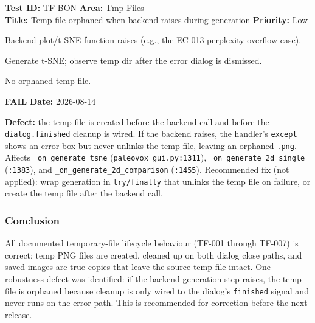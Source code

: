 \documentclass[12pt,a4paper]{article}
\newcommand{\fail}{\textcolor{paleored}{\textbf{FAIL}}}
\newcommand{\testheader}[4]{%
  \smallskip
  \noindent\textbf{Test ID:} #1 \hfill \textbf{Area:} #2 \\
  \textbf{Title:} #3 \hfill \textbf{Priority:} #4
}
\newenvironment{testbody}{%
  \begin{description}[leftmargin=2em,style=nextline]
}{%
  \end{description}
  \smallskip
}
\begin{document}
\testheader{TF-BON}{Tmp Files}{Temp file orphaned when backend raises during generation}{Low}
\begin{testbody}
  \item[\textbf{Preconditions:}] Backend plot/t-SNE function raises (e.g., the
        EC-013 perplexity overflow case).
  \item[\textbf{Steps:}] Generate t-SNE; observe temp dir after the error
        dialog is dismissed.
  \item[\textbf{Expected Result:}] No orphaned temp file.
  \item[\textbf{Status:}] \fail{} \hspace{1em} \textbf{Date:} 2026-08-14
  \item[\textbf{Notes:}] \textbf{Defect:} the temp file is created before the
        backend call and before the \texttt{dialog.finished} cleanup is wired.
        If the backend raises, the handler's \texttt{except} shows an error box
        but never unlinks the temp file, leaving an orphaned \texttt{.png}.
        Affects \texttt{\_on\_generate\_tsne} (\texttt{paleovox\_gui.py:1311}),
        \texttt{\_on\_generate\_2d\_single} (\texttt{:1383}), and
        \texttt{\_on\_generate\_2d\_comparison} (\texttt{:1455}). Recommended
        fix (not applied): wrap generation in \texttt{try/finally} that unlinks
        the temp file on failure, or create the temp file after the backend
        call.
\end{testbody}

\subsubsection{Conclusion}

All documented temporary-file lifecycle behaviour (TF-001 through TF-007) is
correct: temp PNG files are created, cleaned up on both dialog close paths, and
saved images are true copies that leave the source temp file intact. One
robustness defect was identified: if the backend generation step raises, the
temp file is orphaned because cleanup is only wired to the dialog's
\texttt{finished} signal and never runs on the error path. This is recommended
for correction before the next release.

\newpage
\end{document}
